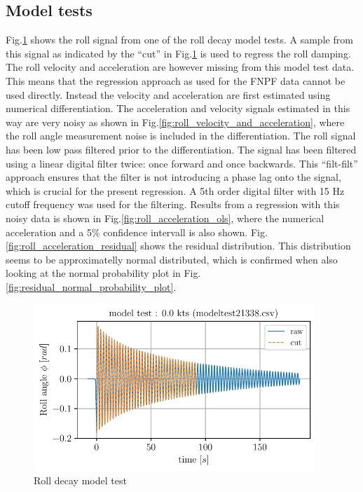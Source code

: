 \subsection*{Model tests}\label{model-tests}
Fig.\ref{fig:roll_decay_model_test} shows the roll signal from
one of the roll decay model tests. A sample from this signal as
indicated by the ``cut'' in Fig.\ref{fig:roll_decay_model_test}
is used to regress the roll damping. The roll velocity and acceleration
are however missing from this model test data. This means that the
regression approach as used for the FNPF data cannot be used directly.
Instead the velocity and acceleration are first estimated using
numerical differentiation. The acceleration and velocity signals
estimated in this way are very noisy as shown in
Fig.\ref{fig:roll_velocity_and_acceleration}, where the roll
angle measurement noise is included in the differentiation. The roll
signal has been low pass filtered prior to the differentiation. The
signal has been filtered using a linear digital filter twice: once
forward and once backwards. This ``filt-filt'' approach ensures that the
filter is not introducing a phase lag onto the signal, which is crucial
for the present regression. A 5th order digital filter with 15 Hz cutoff
frequency was used for the filtering.
Results from a regression with this noisy data is shown in
Fig.\ref{fig:roll_acceleration_ols}, where the numerical
acceleration and a 5\% confidence intervall is also shown.
Fig.\ref{fig:roll_acceleration_residual} shows the residual
distribution. This distribution seems to be approximatelly normal
distributed, which is confirmed when also looking at the normal
probability plot in
Fig.\ref{fig:residual_normal_probability_plot}.
\begin{figure}[H]
\begin{center}\includegraphics[width = 0.95\textwidth]{figures/roll_decay_model_test.pdf}\end{center}
\vspace{-0.7cm}
\caption{Roll decay model test}
\label{fig:roll_decay_model_test}
\end{figure}
